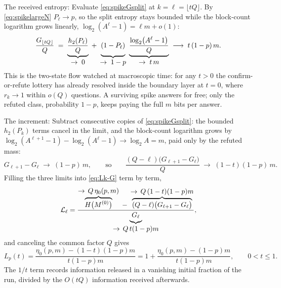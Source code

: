 \documentclass[11pt]{article}
\begin{document}
The received entropy: Evaluate \eqref{eq:spikeGsplit} at
$k = \ell = \lfloor tQ\rfloor$. By \eqref{eq:spikelargeN}
$P_\ell \to p$, so the split entropy stays bounded while the
block-count logarithm grows linearly,
$\log_2(A^\ell-1) = \ell m + o(1)$:
%
\begin{equation}
  \frac{G_{\lfloor tQ\rfloor}}{Q}
  \;=\;
  \underbrace{\frac{h_2(P_\ell)}{Q}}_{\textstyle\to\; 0}
  \;+\;
  \underbrace{(1-P_\ell)\vphantom{\frac{h}{Q}}}
    _{\textstyle\to\; 1-p}
  \;\underbrace{\frac{\log_2\!\big(A^\ell-1\big)}{Q}}
    _{\textstyle\to\; t\,m}
  \;\longrightarrow\; t\,(1-p)\,m .
  \label{eq:spikeGlimit}
\end{equation}
%
This is the two-state flow watched at macroscopic time: for any
$t > 0$ the confirm-or-refute lottery has already resolved inside
the boundary layer at $t = 0$, where $r_k \to 1$ within $o(Q)$
questions. A surviving spike answers for free; only the refuted
class, probability $1-p$, keeps paying the full $m$ bits per answer.

The increment: Subtract consecutive copies of
\eqref{eq:spikeGsplit}: the bounded $h_2(P_k)$ terms cancel in the
limit, and the block-count logarithm grows by
$\log_2(A^{\ell+1}-1) - \log_2(A^\ell-1) \to \log_2 A = m$,
paid only by the refuted mass:
%
\begin{equation}
  G_{\ell+1} - G_\ell \;\longrightarrow\; (1-p)\,m,
  \qquad\text{so}\qquad
  \frac{(Q-\ell)\big(G_{\ell+1}-G_\ell\big)}{Q}
  \;\longrightarrow\; (1-t)(1-p)\,m .
  \label{eq:spikeincrement}
\end{equation}
%
Filling the three limits into \eqref{eq:Lk-G} term by term,
%
\[
  \mathcal L_\ell
  = \frac{\overbrace{H\big(M^{(0)}\big)}^{\textstyle\to\,
      Q\,\eta_0(p,m)}
    \;-\; \overbrace{(Q-\ell)\big(G_{\ell+1}-G_\ell\big)}
      ^{\textstyle\to\, Q\,(1-t)(1-p)m}}
    {\underbrace{G_\ell\vphantom{\big(}}_{\textstyle\to\,
      Q\,t(1-p)m}},
\]
%
and canceling the common factor $Q$ gives
%
\begin{equation}
  L_p(t)
  = \frac{\eta_0(p,m) - (1-t)(1-p)m}{t(1-p)m}
  = 1 + \frac{\eta_0(p,m) - (1-p)m}{t(1-p)m},
  \qquad 0 < t \le 1. 
  \label{eq:spikehyperbola}
\end{equation}
%
The $1/t$ term records information released in a vanishing initial
fraction of the run, divided by the $O(tQ)$ information received
afterwards.
\end{document}
